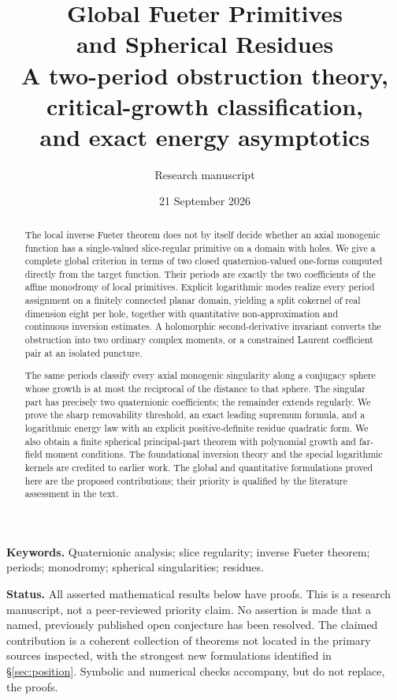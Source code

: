 \documentclass[11pt,a4paper]{article}
\title{\vspace{-10mm}\textbf{Global Fueter Primitives}\\[2pt]\textbf{and Spherical Residues}\\[6pt]
\large A two-period obstruction theory, critical-growth classification,\\
and exact energy asymptotics}
\author{Research manuscript}
\date{21 September 2026}
\numberwithin{equation}{section}
\theoremstyle{definition}
\theoremstyle{remark}
\begin{document}
\maketitle
\thispagestyle{empty}
\begin{abstract}
The local inverse Fueter theorem does not by itself decide whether an axial
monogenic function has a single-valued slice-regular primitive on a domain
with holes. We give a complete global criterion in terms of two closed
quaternion-valued one-forms computed directly from the target function.
Their periods are exactly the two coefficients of the affine monodromy of
local primitives. Explicit logarithmic modes realize every period assignment
on a finitely connected planar domain, yielding a split cokernel of real
dimension eight per hole, together with quantitative non-approximation and
continuous inversion estimates. A holomorphic second-derivative invariant
converts the obstruction into two ordinary complex moments, or a constrained Laurent
coefficient pair at an isolated puncture.

The same periods classify every axial monogenic singularity along a
conjugacy sphere whose growth is at most the reciprocal of the distance to
that sphere. The singular part has precisely two quaternionic coefficients;
the remainder extends regularly. We prove the sharp removability threshold,
an exact leading supremum formula, and a logarithmic energy law with an
explicit positive-definite residue quadratic form. We also obtain a finite
spherical principal-part theorem with polynomial growth and far-field moment
conditions. The foundational inversion theory and the special logarithmic
kernels are credited to earlier work. The global and quantitative formulations
proved here are the proposed contributions; their priority is qualified by the
literature assessment in the text.
\end{abstract}
\medskip
\noindent\textbf{Keywords.} Quaternionic analysis; slice regularity; inverse
Fueter theorem; periods; monodromy; spherical singularities; residues.

\medskip
\noindent\textbf{Status.} All asserted mathematical results below have proofs.
This is a research manuscript, not a peer-reviewed priority claim. No assertion
is made that a named, previously published open conjecture has been resolved.
The claimed contribution is a coherent collection of theorems not located in
the primary sources inspected, with the strongest new formulations identified
in \S\ref{sec:position}. Symbolic and numerical checks accompany, but do not
replace, the proofs.
\end{document}

